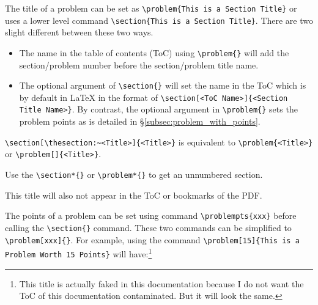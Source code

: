 \documentclass[twoside]{seu-ml-assign}
\begin{document}
      The title of a problem can be set as \verb|\problem{This is a Section Title}| or uses a lower level command \verb|\section{This is a Section Title}|.
      There are two slight different between these two ways.
      \begin{itemize}
        \item The name in the table of contents (ToC) using \verb|\problem{}| will add the section/problem number before the section/problem title name.
        \item The optional argument of \verb|\section{}| will set the name in the ToC which is by default in \LaTeX{} in the format of \verb|\section[<ToC Name>]{<Section Title Name>}|.
        By contrast, the optional argument in \verb|\problem{}| sets the problem points as is detailed in \S\ref{subsec:problem_with_points}.
      \end{itemize}
      \verb|\section[\thesection:~<Title>]{<Title>}|
      is equivalent to
      \verb|\problem{<Title>}| or \verb|\problem[]{<Title>}|.
      
      

      Use the \verb|\section*{}| or \verb|\problem*{}| to get an unnumbered section.\vspace{-8mm}


      This title will also not appear in the ToC or bookmarks of the PDF.

    \label{subsec:problem_with_points}

      The points of a problem can be set using command \verb|\problempts{xxx}| before calling the \verb|\section{}| command.
      These two commands can be simplified to \verb|\problem[xxx]{}|.
      For example, using the command \verb|\problem[15]{This is a Problem Worth 15 Points}| will have:\footnote{This title is actually faked in this documentation because I do not want the ToC of this documentation contaminated. But it will look the same.}\vspace{-8mm}
\end{document}
